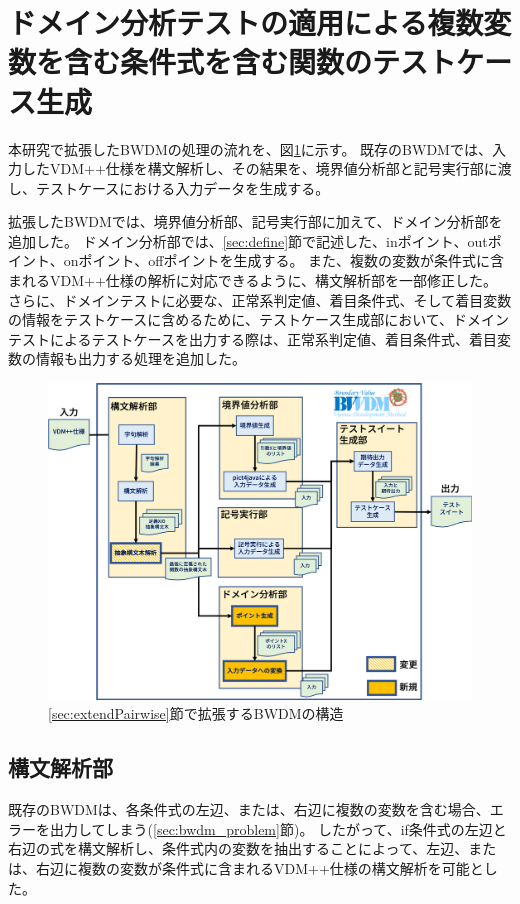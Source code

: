 \documentclass[uplatex, report, a4j, 10pt]{jsbook}
\begin{document}
\section{ドメイン分析テストの適用による複数変数を含む条件式を含む関数のテストケース生成}\label{sec:extendDomain}

本研究で拡張したBWDMの処理の流れを、図\ref{fig:bwdm_structure}に示す。
既存のBWDMでは、入力したVDM++仕様を構文解析し、その結果を、境界値分析部と記号実行部に渡し、テストケースにおける入力データを生成する。

拡張したBWDMでは、境界値分析部、記号実行部に加えて、ドメイン分析部を追加した。
ドメイン分析部では、\ref{sec:define}節で記述した、inポイント、outポイント、onポイント、offポイントを生成する。
また、複数の変数が条件式に含まれるVDM++仕様の解析に対応できるように、構文解析部を一部修正した。
さらに、ドメインテストに必要な、正常系判定値、着目条件式、そして着目変数の情報をテストケースに含めるために、テストケース生成部において、ドメインテストによるテストケースを出力する際は、正常系判定値、着目条件式、着目変数の情報も出力する処理を追加した。

\begin{figure}[t]
  \begin{center}
    \includegraphics[keepaspectratio, width=160mm]{figs/bwdm_structure.png}
    \caption{\ref{sec:extendPairwise}節で拡張するBWDMの構造}
    \label{fig:bwdm_structure}
  \end{center}
\end{figure}

\subsection{構文解析部}
既存のBWDMは、各条件式の左辺、または、右辺に複数の変数を含む場合、エラーを出力してしまう(\ref{sec:bwdm_problem}節)。
したがって、if条件式の左辺と右辺の式を構文解析し、条件式内の変数を抽出することによって、左辺、または、右辺に複数の変数が条件式に含まれるVDM++仕様の構文解析を可能とした。
\end{document}
